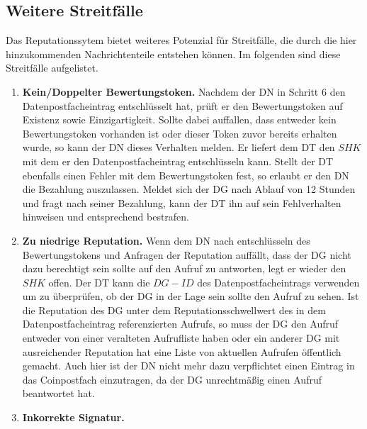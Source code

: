 \documentclass[
	fontsize=11pt,
	headings=small,
	parskip=half,           %
	bibliography=totoc,
	numbers=noenddot,       %
	open=any,               %
]{scrreprt}
\begin{document}
\subsection{Weitere Streitfälle}
\label{subsec:repStreit}
Das Reputationssytem bietet weiteres Potenzial für Streitfälle, die durch die hier hinzukommenden Nachrichtenteile entstehen können. Im folgenden sind diese Streitfälle aufgelistet.
\begin{enumerate}
    \item \textbf{Kein/Doppelter Bewertungstoken.} \label{case:badRepToken}
    Nachdem der DN in Schritt 6 den Datenpostfacheintrag entschlüsselt hat, prüft er den Bewertungstoken auf Existenz sowie Einzigartigkeit. Sollte dabei auffallen, dass entweder kein Bewertungstoken vorhanden ist oder dieser Token zuvor bereits erhalten wurde, so kann der DN dieses Verhalten melden. Er liefert dem DT den $SHK$ mit dem er den Datenpostfacheintrag entschlüsseln kann. Stellt der DT ebenfalls einen Fehler mit dem Bewertungstoken fest, so erlaubt er den DN die Bezahlung auszulassen. Meldet sich der DG nach Ablauf von 12 Stunden und fragt nach seiner Bezahlung, kann der DT ihn auf sein Fehlverhalten hinweisen und entsprechend bestrafen.
    \item \textbf{Zu niedrige Reputation.} \label{case:insufficientRep}
    Wenn dem DN nach entschlüsseln des Bewertungstokens und Anfragen der Reputation auffällt, dass der DG nicht dazu berechtigt sein sollte auf den Aufruf zu antworten, legt er wieder den $SHK$ offen. Der DT kann die $DG-ID$ des Datenpostfacheintrags verwenden um zu überprüfen, ob der DG in der Lage sein sollte den Aufruf zu sehen. Ist die Reputation des DG unter dem Reputationsschwellwert des in dem Datenpostfacheintrag referenzierten Aufrufs, so muss der DG den Aufruf entweder von einer veralteten Aufrufliste haben oder ein anderer DG mit ausreichender Reputation hat eine Liste von aktuellen Aufrufen öffentlich gemacht. Auch hier ist der DN nicht mehr dazu verpflichtet einen Eintrag in das Coinpostfach einzutragen, da der DG unrechtmäßig einen Aufruf beantwortet hat.
    \item \textbf{Inkorrekte Signatur.} \label{case:badSignature}

\end{enumerate}
\end{document}
